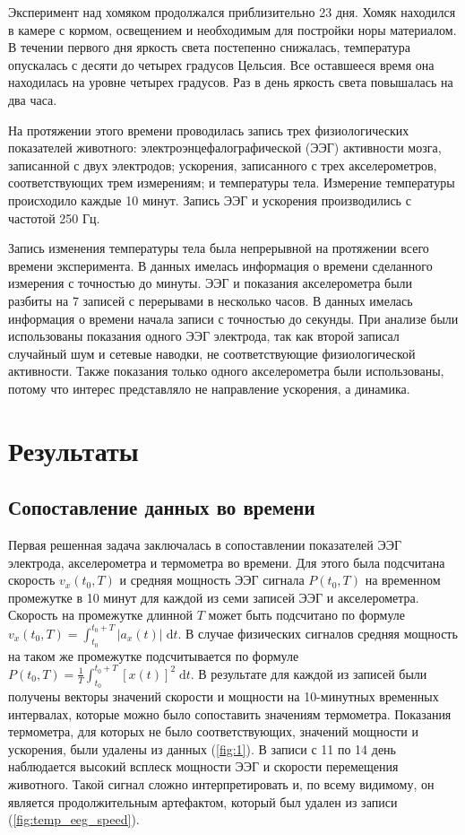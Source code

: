\documentclass[12pt,a4paper,oneside]{article}
\begin{document}
Эксперимент над хомяком продолжался приблизительно 23 дня. Хомяк находился в камере с кормом, освещением и необходимым для постройки норы материалом. В течении первого дня яркость света постепенно снижалась, температура опускалась с десяти до четырех градусов Цельсия. Все оставшееся время она находилась на уровне четырех градусов. Раз в день яркость света повышалась на два часа.

На протяжении этого времени проводилась запись трех физиологических показателей животного: электроэнцефалографической (ЭЭГ) активности мозга, записанной с двух электродов; ускорения, записанного с трех акселерометров, соответствующих трем измерениям; и температуры тела. Измерение температуры происходило каждые 10 минут. Запись ЭЭГ и ускорения производились с частотой 250 Гц. 

Запись изменения температуры тела была непрерывной на протяжении всего времени эксперимента. В данных имелась информация о времени сделанного измерения с точностью до минуты. ЭЭГ и показания акселерометра были разбиты на 7 записей с перерывами в несколько часов. В данных имелась информация о времени начала записи с точностью до секунды. При анализе были использованы показания одного ЭЭГ электрода, так как второй записал случайный шум и сетевые наводки, не соответствующие физиологической активности. Также показания только одного акселерометра были использованы, потому что интерес представляло не направление ускорения, а динамика. 

\section{Результаты} %

\subsection{Сопоставление данных во времени}

Первая решенная задача заключалась в сопоставлении показателей ЭЭГ электрода, акселерометра и термометра во времени. Для этого была подсчитана скорость $v_{x}(t_0, T)$ и средняя мощность ЭЭГ сигнала $P(t_0, T)$ на временном промежутке в 10 минут для каждой из семи записей ЭЭГ и акселерометра. Скорость на промежутке длинной $T$ может быть подсчитано по формуле $v_{x}(t_0, T) = \int_{t_0}^{t_0 + T} | a_{x}(t)| \; \text{d}t$. В случае физических сигналов средняя мощность на таком же промежутке подсчитывается по формуле $P(t_0, T) = \frac{1}{T} \int_{t_0}^{t_0 + T} [x(t)]^2 \; \text{d}t$. В результате для каждой из записей были получены векторы значений скорости и мощности на 10-минутных временных интервалах, которые можно было сопоставить значениям термометра. Показания термометра, для которых не было соответствующих, значений мощности и ускорения, были удалены из данных (\ref{fig:1}). В записи с 11 по 14 день наблюдается высокий всплеск мощности ЭЭГ и скорости перемещения животного. Такой сигнал сложно интерпретировать и, по всему видимому, он является продолжительным артефактом, который был удален из записи (\ref{fig:temp_eeg_speed}). 
\end{document}
